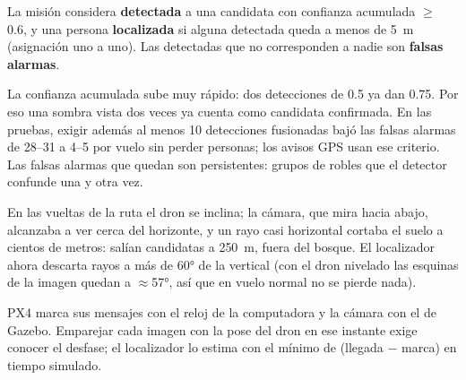 La misión considera \textbf{detectada} a una candidata con confianza acumulada $\ge$ 0.6, y una persona
\textbf{localizada} si alguna detectada queda a menos de 5~m (asignación uno a uno). Las detectadas que
no corresponden a nadie son \textbf{falsas alarmas}.

\begin{leccion}
La confianza acumulada sube muy rápido: dos detecciones de 0.5 ya dan 0.75. Por eso una sombra vista
dos veces ya cuenta como candidata confirmada. En las pruebas, exigir además al menos 10 detecciones
fusionadas bajó las falsas alarmas de 28--31 a 4--5 por vuelo sin perder personas; los avisos GPS usan
ese criterio. Las falsas alarmas que quedan son persistentes: grupos de robles que el detector confunde
una y otra vez.
\end{leccion}

\begin{leccion}
En las vueltas de la ruta el dron se inclina; la cámara, que mira hacia abajo, alcanzaba a ver cerca del
horizonte, y un rayo casi horizontal cortaba el suelo a cientos de metros: salían candidatas a 250~m,
fuera del bosque. El localizador ahora descarta rayos a más de 60° de la vertical (con el dron nivelado
las esquinas de la imagen quedan a $\approx$57°, así que en vuelo normal no se pierde nada).
\end{leccion}

\begin{leccion}
PX4 marca sus mensajes con el reloj de la computadora y la cámara con el de Gazebo. Emparejar cada
imagen con la pose del dron en ese instante exige conocer el desfase; el localizador lo estima con el
mínimo de (llegada $-$ marca) en tiempo simulado.
\end{leccion}
